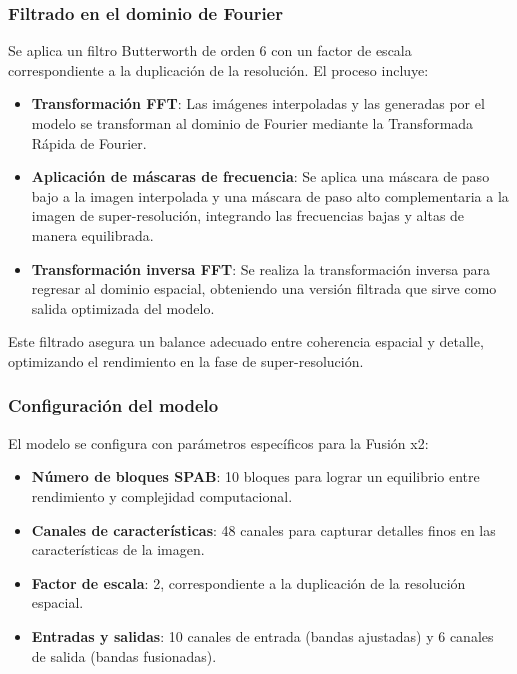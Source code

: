         \subsubsection{Filtrado en el dominio de Fourier}

            Se aplica un filtro Butterworth de orden 6 con un factor de escala correspondiente a la duplicación de la resolución. El proceso incluye:

            \begin{itemize}
                \item \textbf{Transformación FFT}: Las imágenes interpoladas y las generadas por el modelo se transforman al dominio de Fourier mediante la Transformada Rápida de Fourier.
                \item \textbf{Aplicación de máscaras de frecuencia}: Se aplica una máscara de paso bajo a la imagen interpolada y una máscara de paso alto complementaria a la imagen de super-resolución, integrando las frecuencias bajas y altas de manera equilibrada.
                \item \textbf{Transformación inversa FFT}: Se realiza la transformación inversa para regresar al dominio espacial, obteniendo una versión filtrada que sirve como salida optimizada del modelo.
            \end{itemize}

            Este filtrado asegura un balance adecuado entre coherencia espacial y detalle, optimizando el rendimiento en la fase de super-resolución.

        \subsubsection{Configuración del modelo}

            El modelo se configura con parámetros específicos para la Fusión x2:

            \begin{itemize}
                \item \textbf{Número de bloques SPAB}: 10 bloques para lograr un equilibrio entre rendimiento y complejidad computacional.
                \item \textbf{Canales de características}: 48 canales para capturar detalles finos en las características de la imagen.
                \item \textbf{Factor de escala}: 2, correspondiente a la duplicación de la resolución espacial.
                \item \textbf{Entradas y salidas}: 10 canales de entrada (bandas ajustadas) y 6 canales de salida (bandas fusionadas).
            \end{itemize}

